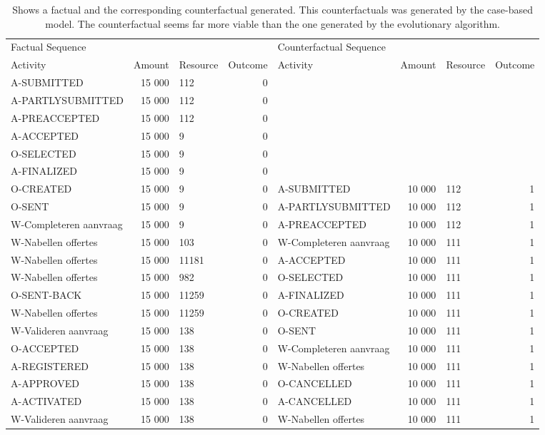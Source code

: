 \begin{table}
\caption{Shows a factual and the corresponding counterfactual generated. This counterfactuals was generated by the case-based model. The counterfactual seems far more viable than the one generated by the evolutionary algorithm.}
\label{tbl:example-cf-cbg}
\begin{tabular}{lrlrlrlr}
\toprule
\multicolumn{4}{l}{Factual Sequence} & \multicolumn{4}{l}{Counterfactual Sequence} \\
Activity & Amount & Resource & Outcome & Activity & Amount & Resource & Outcome \\
\midrule
A-SUBMITTED & 15 000 & 112 & 0 &  &  &  &  \\
A-PARTLYSUBMITTED & 15 000 & 112 & 0 &  &  &  &  \\
A-PREACCEPTED & 15 000 & 112 & 0 &  &  &  &  \\
A-ACCEPTED & 15 000 & 9 & 0 &  &  &  &  \\
O-SELECTED & 15 000 & 9 & 0 &  &  &  &  \\
A-FINALIZED & 15 000 & 9 & 0 &  &  &  &  \\
O-CREATED & 15 000 & 9 & 0 & A-SUBMITTED & 10 000 & 112 & 1 \\
O-SENT & 15 000 & 9 & 0 & A-PARTLYSUBMITTED & 10 000 & 112 & 1 \\
W-Completeren aanvraag & 15 000 & 9 & 0 & A-PREACCEPTED & 10 000 & 112 & 1 \\
W-Nabellen offertes & 15 000 & 103 & 0 & W-Completeren aanvraag & 10 000 & 111 & 1 \\
W-Nabellen offertes & 15 000 & 11181 & 0 & A-ACCEPTED & 10 000 & 111 & 1 \\
W-Nabellen offertes & 15 000 & 982 & 0 & O-SELECTED & 10 000 & 111 & 1 \\
O-SENT-BACK & 15 000 & 11259 & 0 & A-FINALIZED & 10 000 & 111 & 1 \\
W-Nabellen offertes & 15 000 & 11259 & 0 & O-CREATED & 10 000 & 111 & 1 \\
W-Valideren aanvraag & 15 000 & 138 & 0 & O-SENT & 10 000 & 111 & 1 \\
O-ACCEPTED & 15 000 & 138 & 0 & W-Completeren aanvraag & 10 000 & 111 & 1 \\
A-REGISTERED & 15 000 & 138 & 0 & W-Nabellen offertes & 10 000 & 111 & 1 \\
A-APPROVED & 15 000 & 138 & 0 & O-CANCELLED & 10 000 & 111 & 1 \\
A-ACTIVATED & 15 000 & 138 & 0 & A-CANCELLED & 10 000 & 111 & 1 \\
W-Valideren aanvraag & 15 000 & 138 & 0 & W-Nabellen offertes & 10 000 & 111 & 1 \\
\bottomrule
\end{tabular}
\end{table}
